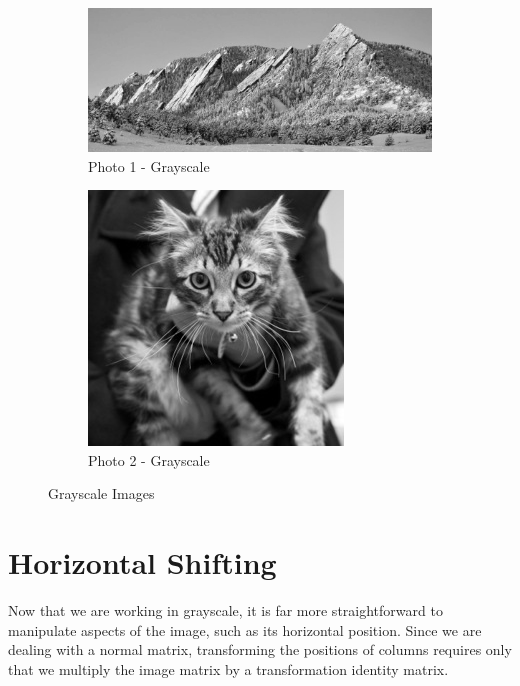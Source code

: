 \documentclass[10pt]{report}
\begin{document}
    \begin{figure}[ht]
        \centering
        \begin{subfigure}{\textwidth}
            \centering
            \includegraphics[scale=0.7]{./img/gray1.png}
            \caption{Photo 1 - Grayscale}
            \label{fig:p1g}
        \end{subfigure}
        \begin{subfigure}{\textwidth}
            \centering
            \includegraphics[scale=0.7]{./img/gray2.png}
            \caption{Photo 2 - Grayscale}
            \label{fig:p2g}
        \end{subfigure}
        \caption{Grayscale Images}
        \label{fig:gray_images}
    \end{figure}

\section{Horizontal Shifting}

Now that we are working in grayscale, it is far more straightforward to manipulate aspects of the image, such as its horizontal position.  Since we are dealing with a normal matrix, transforming the positions of columns requires only that we multiply the image matrix by a transformation identity matrix.
\end{document}
